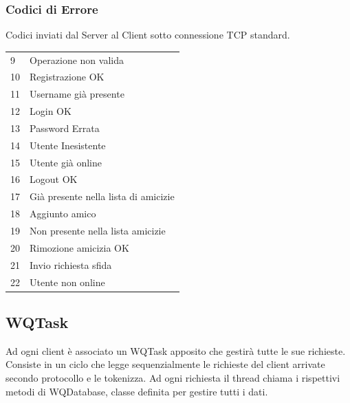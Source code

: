 \documentclass{article}
\begin{document}
\subsubsection{Codici di Errore}
Codici inviati dal Server al Client sotto connessione TCP standard.
\begin{table}[h]
\centering
\begin{tabular}{l|l}
9  & Operazione non valida                 \\
10 & Registrazione OK                      \\
11 & Username già presente                 \\
12 & Login OK                              \\
13 & Password Errata                       \\
14 & Utente Inesistente                    \\
15 & Utente già online                     \\
16 & Logout OK                             \\
17 & Già presente nella lista di amicizie  \\
18 & Aggiunto amico                        \\
19 & Non presente nella lista amicizie                     \\
20 & Rimozione amicizia OK                 \\
21 & Invio richiesta sfida                 \\
22 & Utente non online                    
\end{tabular}
\end{table}

\subsection{WQTask}
Ad ogni client è associato un WQTask apposito che gestirà tutte le sue richieste. Consiste in un ciclo che legge sequenzialmente le richieste del client arrivate secondo protocollo e le tokenizza. Ad ogni richiesta il thread chiama i rispettivi metodi di WQDatabase, classe definita per gestire tutti i dati. 
\end{document}
